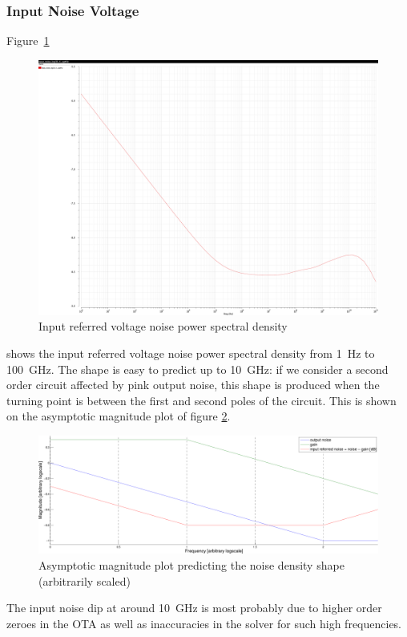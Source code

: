 \documentclass[english,10pt]{article}
\begin{document}
\subsubsection{Input Noise Voltage}
Figure~\ref{fig:noise}
\begin{figure}[htbp]
  \centering
  \includegraphics[width = \textwidth]{noise_1.pdf}
  \caption{Input referred voltage noise power spectral density\label{fig:noise}}
\end{figure}
shows the input referred voltage noise power spectral density from \SI{1}{\hertz} to \SI{100}{\giga\hertz}. The shape is easy to predict up to \SI{10}{\giga\hertz}: if we consider a second order circuit affected by pink output noise, this shape is produced when the turning point is between the first and second poles of the circuit. This is shown on the asymptotic magnitude plot of figure \ref{fig:noiseAsym}.
\begin{figure}[htbp]
  \centering
  \includegraphics[width = \textwidth]{noiseAsym.pdf}
  \caption{Asymptotic magnitude plot predicting the noise density shape (arbitrarily scaled)\label{fig:noiseAsym}}
\end{figure}
The input noise dip at around \SI{10}{\giga\hertz} is most probably due to higher order zeroes in the OTA as well as inaccuracies in the solver for such high frequencies.
\end{document}
